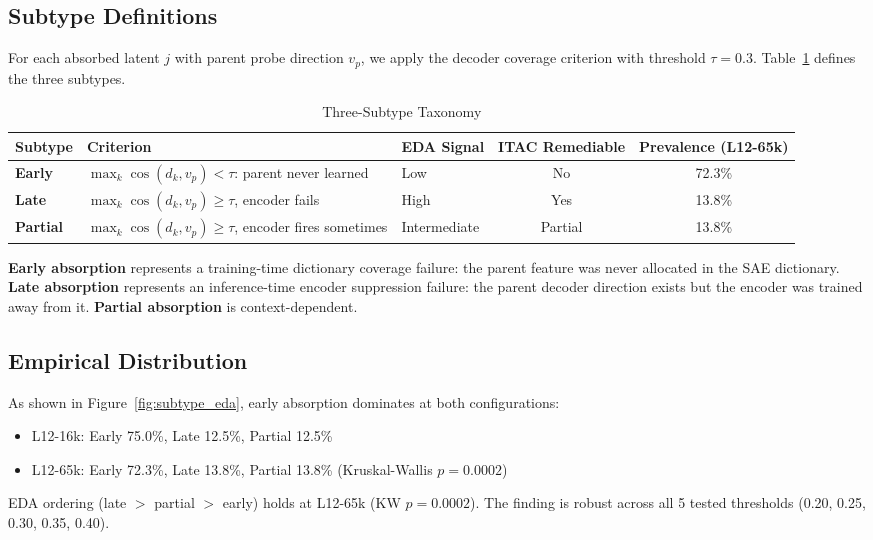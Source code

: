 \documentclass{article}
\begin{document}
\subsection{Subtype Definitions}

For each absorbed latent $j$ with parent probe direction $v_p$, we apply the decoder coverage criterion with threshold $\tau = 0.3$. Table~\ref{tab:taxonomy} defines the three subtypes.

\begin{table}[t]
\caption{Three-Subtype Taxonomy}
\label{tab:taxonomy}
\centering
\small
\begin{tabular}{lllcc}
\toprule
Subtype & Criterion & EDA Signal & ITAC Remediable & Prevalence (L12-65k) \\
\midrule
\textbf{Early} & $\max_k \cos(d_k, v_p) < \tau$: parent never learned & Low & No & 72.3\% \\
\textbf{Late} & $\max_k \cos(d_k, v_p) \geq \tau$, encoder fails & High & Yes & 13.8\% \\
\textbf{Partial} & $\max_k \cos(d_k, v_p) \geq \tau$, encoder fires sometimes & Intermediate & Partial & 13.8\% \\
\bottomrule
\end{tabular}
\end{table}

\textbf{Early absorption} represents a training-time dictionary coverage failure: the parent feature was never allocated in the SAE dictionary. \textbf{Late absorption} represents an inference-time encoder suppression failure: the parent decoder direction exists but the encoder was trained away from it. \textbf{Partial absorption} is context-dependent.

\subsection{Empirical Distribution}

As shown in Figure~\ref{fig:subtype_eda}, early absorption dominates at both configurations:
\begin{itemize}
\item L12-16k: Early 75.0\%, Late 12.5\%, Partial 12.5\%
\item L12-65k: Early 72.3\%, Late 13.8\%, Partial 13.8\% (Kruskal-Wallis $p = 0.0002$)
\end{itemize}

EDA ordering (late $>$ partial $>$ early) holds at L12-65k (KW $p = 0.0002$). The finding is robust across all 5 tested thresholds (0.20, 0.25, 0.30, 0.35, 0.40).
\end{document}
